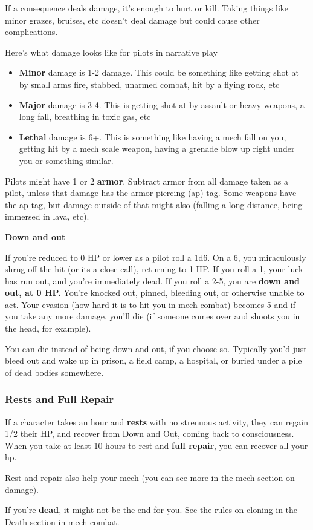 If a consequence deals damage, it's enough to hurt or kill. Taking things like minor grazes, bruises, etc doesn't deal damage but could cause other complications.

Here's what damage looks like for pilots in narrative play
\begin{itemize}
\item \textbf{Minor} damage is 1-2 damage. This could be something like getting shot at by small arms fire, stabbed, unarmed combat, hit by a flying rock, etc
\item \textbf{Major} damage is 3-4. This is getting shot at by assault or heavy weapons, a long fall, breathing in toxic gas, etc
\item \textbf{Lethal} damage is 6+. This is something like having a mech fall on you, getting hit by a mech scale weapon, having a grenade blow up right under you or something similar.
\end{itemize}  

Pilots might have 1 or 2 \textbf{armor}. Subtract armor from all damage taken as a pilot, unless that damage has the armor piercing (ap) tag. Some weapons have the ap tag, but damage outside of that might also (falling a long distance, being immersed in lava, etc).

                                                \textbf{Down and out} 

If you're reduced to 0 HP or lower as a pilot roll a 1d6. On a 6, you miraculously shrug off the hit (or its a close call), returning to 1 HP. If you roll a 1, your luck has run out, and you're immediately dead. If you roll a 2-5, you are \textbf{down and out, at 0 HP.} You're knocked out, pinned, bleeding out, or otherwise unable to act. Your evasion (how hard it is to hit you in mech combat) becomes 5 and if you take any more damage, you'll die (if someone comes over and shoots you in the head, for example).

You can die instead of being down and out, if you choose so. Typically you'd just bleed out and wake up in prison, a field camp, a hospital, or buried under a pile of dead bodies somewhere.

\subsubsection{Rests and Full Repair}

If a character takes an hour and \textbf{rests} with no strenuous activity, they can regain 1/2 their HP, and recover from Down and Out, coming back to consciousness. When you take at least 10 hours to rest and \textbf{full repair}, you can recover all your hp. 

Rest and repair also help your mech (you can see more in the mech section on damage). 

If you're \textbf{dead}, it might not be the end for you. See the rules on cloning in the Death section in mech combat.